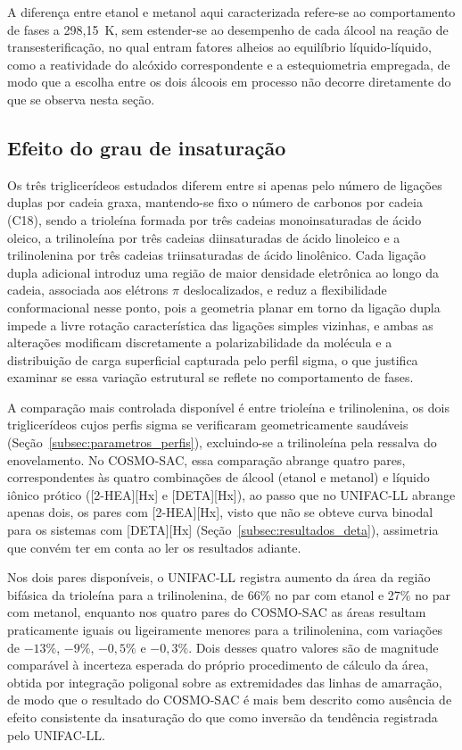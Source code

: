 A diferença entre etanol e metanol aqui caracterizada refere-se ao comportamento de fases a 298,15~K, sem estender-se ao desempenho de cada álcool na reação de transesterificação, no qual entram fatores alheios ao equilíbrio líquido-líquido, como a reatividade do alcóxido correspondente e a estequiometria empregada, de modo que a escolha entre os dois álcoois em processo não decorre diretamente do que se observa nesta seção.

\subsection{Efeito do grau de insaturação}
\label{subsec:insaturacao}

Os três triglicerídeos estudados diferem entre si apenas pelo número de ligações duplas por cadeia graxa, mantendo-se fixo o número de carbonos por cadeia (C18), sendo a trioleína formada por três cadeias monoinsaturadas de ácido oleico, a trilinoleína por três cadeias diinsaturadas de ácido linoleico e a trilinolenina por três cadeias triinsaturadas de ácido linolênico. Cada ligação dupla adicional introduz uma região de maior densidade eletrônica ao longo da cadeia, associada aos elétrons $\pi$ deslocalizados, e reduz a flexibilidade conformacional nesse ponto, pois a geometria planar em torno da ligação dupla impede a livre rotação característica das ligações simples vizinhas, e ambas as alterações modificam discretamente a polarizabilidade da molécula e a distribuição de carga superficial capturada pelo perfil sigma, o que justifica examinar se essa variação estrutural se reflete no comportamento de fases.

A comparação mais controlada disponível é entre trioleína e trilinolenina, os dois triglicerídeos cujos perfis sigma se verificaram geometricamente saudáveis (Seção~\ref{subsec:parametros_perfis}), excluindo-se a trilinoleína pela ressalva do enovelamento. No COSMO-SAC, essa comparação abrange quatro pares, correspondentes às quatro combinações de álcool (etanol e metanol) e líquido iônico prótico ([2-HEA][Hx] e [DETA][Hx]), ao passo que no UNIFAC-LL abrange apenas dois, os pares com [2-HEA][Hx], visto que não se obteve curva binodal para os sistemas com [DETA][Hx] (Seção~\ref{subsec:resultados_deta}), assimetria que convém ter em conta ao ler os resultados adiante.

Nos dois pares disponíveis, o UNIFAC-LL registra aumento da área da região bifásica da trioleína para a trilinolenina, de 66\% no par com etanol e 27\% no par com metanol, enquanto nos quatro pares do COSMO-SAC as áreas resultam praticamente iguais ou ligeiramente menores para a trilinolenina, com variações de $-13\%$, $-9\%$, $-0{,}5\%$ e $-0{,}3\%$. Dois desses quatro valores são de magnitude comparável à incerteza esperada do próprio procedimento de cálculo da área, obtida por integração poligonal sobre as extremidades das linhas de amarração, de modo que o resultado do COSMO-SAC é mais bem descrito como ausência de efeito consistente da insaturação do que como inversão da tendência registrada pelo UNIFAC-LL.

